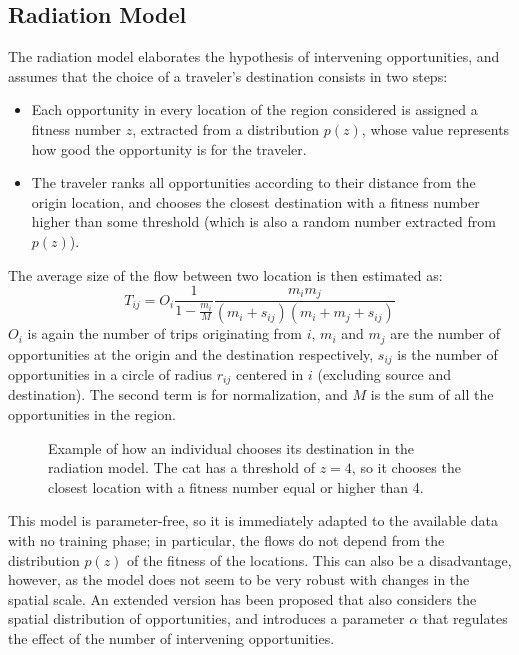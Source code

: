 \subsection{Radiation Model}
The radiation model elaborates the hypothesis of intervening opportunities, and assumes that the choice of a traveler's destination consists in two steps:
\begin{itemize}
    \item Each opportunity in every location of the region considered is assigned a fitness number $z$, extracted from a distribution $p(z)$, whose value represents how good the opportunity is for the traveler.
    \item The traveler ranks all opportunities according to their distance from the origin location, and chooses the closest destination with a fitness number higher than some threshold (which is also a random number extracted from $p(z)$). 
\end{itemize}
The average size of the flow between two location is then estimated as:
\begin{equation*}
    T_{ij} = O_i \frac{1}{1 - \frac{m_i}{M}} \frac{m_i m_j}{(m_i + s_{ij}) (m_i + m_j + s_{ij})}
\end{equation*}
$O_i$ is again the number of trips originating from $i$, $m_i$ and $m_j$ are the number of opportunities at the origin and the destination respectively, $s_{ij}$ is the number of opportunities in a circle of radius $r_{ij}$ centered in $i$ (excluding source and destination). The second term is for normalization, and $M$ is the sum of all the opportunities in the region.

\begin{figure}[H]
    \centering
    
    \caption{Example of how an individual chooses its destination in the radiation model. The cat has a threshold of $z=4$, so it chooses the closest location with a fitness number equal or higher than 4.}
\end{figure}

This model is parameter-free, so it is immediately adapted to the available data with no training phase; in particular, the flows do not depend from the distribution $p(z)$ of the fitness of the locations. This can also be a disadvantage, however, as the model does not seem to be very robust with changes in the spatial scale. An extended version has been proposed that also considers the spatial distribution of opportunities, and introduces a parameter $\alpha$ that regulates the effect of the number of intervening opportunities.

